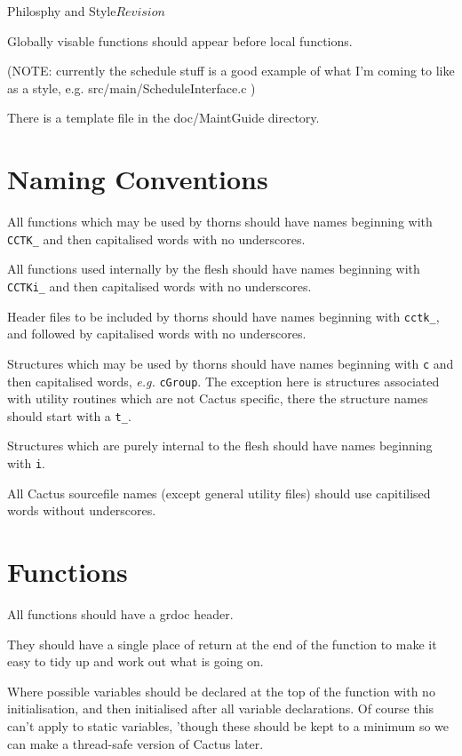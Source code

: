\begin{cactuspart}{1}{Philosphy and Style}{}{$Revision$}
\begin{itemize}
\end{itemize}

Globally visable functions should appear before local
functions.

(NOTE: currently the schedule stuff is a good example of
what I'm coming to like as a style, e.g.
src/main/ScheduleInterface.c )

There is a template file in the doc/MaintGuide directory.

\section{Naming Conventions}

All functions which may be used by thorns should have names beginning
with {\tt CCTK\_} and then capitalised words with no underscores.

All functions used internally by the flesh should have names beginning with
{\tt CCTKi\_} and then capitalised words with no underscores.

Header files to be included by thorns should have names beginning with
{\tt cctk\_}, and followed by capitalised words with no underscores.

Structures which may be used by thorns should have names beginning with
{\tt c} and then capitalised words, {\it e.g.} {\tt cGroup}. The 
exception here is structures associated with utility routines which
are not Cactus specific, there the structure names should start with a
{\tt t\_}. 

Structures which are purely internal to the flesh should have
names beginning with {\tt i}.

All Cactus sourcefile names (except general utility files) should 
use capitilised words without underscores.

\section{Functions}

All functions should have a grdoc header.

They should have a single place of return at the end of the function to
make it easy to tidy up and work out what is going on.

Where possible variables should be declared at the top of the function with
no initialisation, and then initialised after all variable declarations. Of
course this can't apply to static variables, 'though these should be kept to
a minimum so we can make a thread-safe version of Cactus later.

\end{cactuspart}
